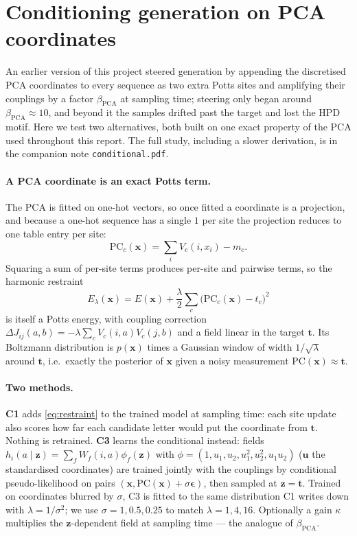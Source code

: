\section{Conditioning generation on PCA coordinates}\label{sec:cond}
An earlier version of this project steered generation by appending the discretised PCA coordinates
to every sequence as two extra Potts sites and amplifying their couplings by a factor
$\beta_\mathrm{PCA}$ at sampling time; steering only began around $\beta_\mathrm{PCA}\approx10$, and
beyond it the samples drifted past the target and lost the HPD motif. Here we test two
alternatives, both built on one exact property of the PCA used throughout this report. The full
study, including a slower derivation, is in the companion note \texttt{conditional.pdf}.

\paragraph{A PCA coordinate is an exact Potts term.} The PCA is fitted on one-hot vectors, so once
fitted a coordinate is a projection, and because a one-hot sequence has a single $1$ per site the
projection reduces to one table entry per site:
\begin{equation}
\mathrm{PC}_c(\bm x)=\sum_{i}V_c(i,x_i)-m_c .
\end{equation}
Squaring a sum of per-site terms produces per-site and pairwise terms, so the harmonic restraint
\begin{equation}
E_\lambda(\bm x)=E(\bm x)+\frac{\lambda}{2}\sum_c\big(\mathrm{PC}_c(\bm x)-t_c\big)^2
\label{eq:restraint}
\end{equation}
is itself a Potts energy, with coupling correction $\Delta J_{ij}(a,b)=-\lambda\sum_cV_c(i,a)V_c(j,b)$
and a field linear in the target $\bm t$. Its Boltzmann distribution is $p(\bm x)$ times a Gaussian
window of width $1/\sqrt\lambda$ around $\bm t$, i.e.\ exactly the posterior of $\bm x$ given a noisy
measurement $\mathrm{PC}(\bm x)\approx\bm t$.

\paragraph{Two methods.} \textbf{C1} adds \eqref{eq:restraint} to the trained model at sampling time:
each site update also scores how far each candidate letter would put the coordinate from $\bm t$.
Nothing is retrained. \textbf{C3} learns the conditional instead: fields
$h_i(a\mid\bm z)=\sum_fW_f(i,a)\phi_f(\bm z)$ with $\phi=(1,u_1,u_2,u_1^2,u_2^2,u_1u_2)$ ($\bm u$ the
standardised coordinates) are trained jointly with the couplings by conditional pseudo-likelihood on
pairs $(\bm x,\mathrm{PC}(\bm x)+\sigma\bm\epsilon)$, then sampled at $\bm z=\bm t$. Trained on
coordinates blurred by $\sigma$, C3 is fitted to the same distribution C1 writes down with
$\lambda=1/\sigma^2$; we use $\sigma=1,0.5,0.25$ to match $\lambda=1,4,16$. Optionally a gain $\kappa$
multiplies the $\bm z$-dependent field at sampling time --- the analogue of $\beta_\mathrm{PCA}$.

